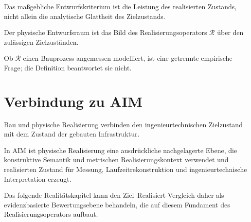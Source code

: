 \begin{proposition}
\label{prop:realization-aware-design}
Das maßgebliche Entwurfskriterium ist die Leistung des realisierten Zustands,
nicht allein die analytische Glattheit des Zielzustands.
\end{proposition}

\begin{definition}
\label{prop:physical-design-space}
Der physische Entwurfsraum ist das Bild des Realisierungsoperators
\(\mathcal R\) über den zulässigen Zielzuständen.
\end{definition}

Ob \(\mathcal R\) einen Bauprozess angemessen modelliert, ist eine
getrennte empirische Frage; die Definition beantwortet sie nicht.

\section{Verbindung zu AIM}

\begin{summary}
Bau und physische Realisierung verbinden den ingenieurtechnischen Zielzustand
mit dem Zustand der gebauten Infrastruktur.

In AIM ist physische Realisierung eine ausdrückliche nachgelagerte Ebene, die
konstruktive Semantik und metrischen Realisierungskontext verwendet und
realisierten Zustand für Messung, Laufzeitrekonstruktion und
ingenieurtechnische Interpretation erzeugt.

Das folgende Realitätskapitel kann den Ziel--Realisiert-Vergleich daher als
evidenzbasierte Bewertungsebene behandeln, die auf diesem Fundament des
Realisierungsoperators aufbaut.
\end{summary}
